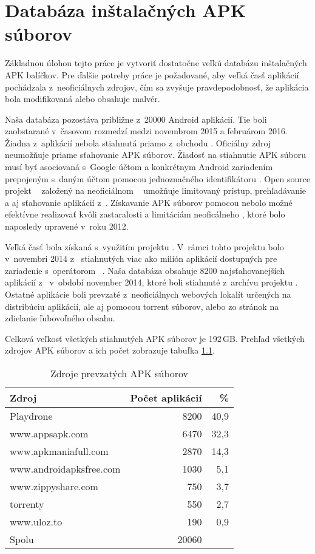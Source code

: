 \chapter{Databáza inštalačných APK súborov}
Základnou úlohou tejto práce je vytvoriť dostatočne veľkú databázu inštalačných APK balíčkov. Pre ďalšie potreby práce je požadované, aby veľká časť aplikácií pochádzala z~neoficiálnych zdrojov, čím sa zvyšuje pravdepodobnosť, že aplikácia bola modifikovaná alebo obsahuje malvér.

Naša databáza pozostáva približne z~20000 Android aplikácií. Tie boli zaobstarané v~časovom rozmedzí medzi novembrom 2015 a februárom 2016. Žiadna z~aplikácií nebola stiahnutá priamo z~obchodu . Oficiálny zdroj  neumožňuje priame sťahovanie APK súborov. Žiadosť na stiahnutie APK súboru musí byť asociovaná s~Google účtom a konkrétnym Android zariadením prepojeným s~daným účtom pomocou jednoznačného identifikátoru . Open source projekt ~\cite{gpCrawler} založený na neoficiálnom ~\cite{gpApi} umožňuje limitovaný prístup, prehľadávanie a aj sťahovanie aplikácií z~. Získavanie APK súborov pomocou  nebolo možné efektívne realizovať kvôli zastaralosti a limitáciám neoficálneho , ktoré bolo naposledy upravené v~roku 2012.

Veľká časť bola získaná s~využitím projektu . V~rámci tohto projektu bolo v~novembri 2014 z~ stiahnutých viac ako milión aplikácií dostupných pre zariadenie  s~operátorom ~\cite{Viennot2014}. Naša databáza obsahuje 8200 najsťahovanejších aplikácií z~ v~období november 2014, ktoré boli stiahnuté z~archívu projektu . Ostatné aplikácie boli prevzaté z~neoficiálnych webových lokalít určených na distribúciu aplikácií, ale aj pomocou torrent súborov, alebo zo stránok na zdielanie ľubovoľného obsahu.

Celková veľkosť všetkých stiahnutých APK súborov je 192\,GB. Prehľad všetkých zdrojov APK súborov a ich počet zobrazuje tabuľka \ref{tab:stahovanie}. 

\begin{table}[htb]
\centering
  \begin{tabular}{|l r r|}
    \hline
    \textbf{Zdroj} & \textbf{Počet aplikácií} & \textbf{\%} \\\hline\hline
    Playdrone & 8200 & 40,9\\
    www.appsapk.com & 6470 & 32,3\\
    www.apkmaniafull.com & 2870 & 14,3\\
    www.androidapksfree.com & 1030 & 5,1\\
    www.zippyshare.com & 750 & 3,7\\
    torrenty & 550 & 2,7\\
    www.uloz.to & 190 & 0,9\\
    \midrule\hline
    Spolu & 20060 & \\
    \hline
  \end{tabular}
  \caption{Zdroje prevzatých APK súborov}
  \label{tab:stahovanie}
\end{table}



